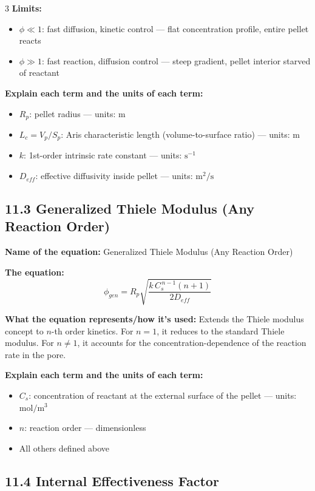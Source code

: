 \documentclass[8pt]{extarticle}
\begin{document}
\begin{multicols*}{3}
\textbf{Limits:}
\begin{itemize}
\item \(\phi\ll 1\): fast diffusion, kinetic control --- flat concentration profile, entire pellet reacts
\item \(\phi\gg 1\): fast reaction, diffusion control --- steep gradient, pellet interior starved of reactant
\end{itemize}

\textbf{Explain each term and the units of each term:}
\begin{itemize}
\item \(R_p\): pellet radius --- units: \(\mathrm{m}\)
\item \(L_c=V_p/S_p\): Aris characteristic length (volume-to-surface ratio) --- units: \(\mathrm{m}\)
\item \(k\): 1st-order intrinsic rate constant --- units: \(\mathrm{s^{-1}}\)
\item \(D_{eff}\): effective diffusivity inside pellet --- units: \(\mathrm{m^2/s}\)
\end{itemize}

\subsection*{11.3 Generalized Thiele Modulus (Any Reaction Order)}

\textbf{Name of the equation:} Generalized Thiele Modulus (Any Reaction Order)

\textbf{The equation:}
\[
\phi_{gen}
=
R_p\sqrt{\frac{k\,C_s^{\,n-1}(n+1)}{2D_{eff}}}
\]

\textbf{What the equation represents/how it's used:} Extends the Thiele modulus concept to \(n\)-th order kinetics. For \(n=1\), it reduces to the standard Thiele modulus. For \(n\neq 1\), it accounts for the concentration-dependence of the reaction rate in the pore.

\textbf{Explain each term and the units of each term:}
\begin{itemize}
\item \(C_s\): concentration of reactant at the external surface of the pellet --- units: \(\mathrm{mol/m^3}\)
\item \(n\): reaction order --- dimensionless
\item All others defined above
\end{itemize}

\subsection*{11.4 Internal Effectiveness Factor}


\end{multicols*}
\end{document}
